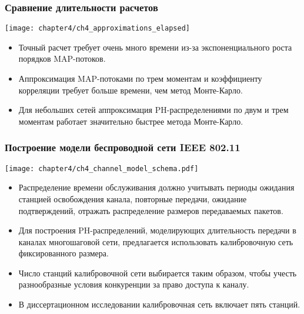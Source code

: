 \begin{frame}
    \frametitle{Сравнение длительности расчетов}
    \begin{center}
        \texttt{[image: chapter4/ch4\_approximations\_elapsed]}
    \end{center}
    \footnotesize
    \begin{itemize}
        \item Точный расчет требует очень много времени из-за экспоненциального роста порядков MAP-потоков.
        \item Аппроксимация MAP-потоками по трем моментам и коэффициенту корреляции требует больше времени, чем метод Монте-Карло.
        \item Для небольших сетей аппроксимация PH-распределениями по двум и трем моментам работает значительно быстрее метода Монте-Карло.
    \end{itemize}
\end{frame}

\begin{frame}
    \frametitle{Построение модели беспроводной сети IEEE 802.11}
    \begin{center}
        \texttt{[image: chapter4/ch4\_channel\_model\_schema.pdf]}
    \end{center}
    \footnotesize
    \begin{itemize}
        \item Распределение времени обслуживания должно учитывать периоды ожидания станцией освобождения канала, повторные передачи, ожидание подтверждений, отражать распределение размеров передаваемых пакетов.
        \item Для построения PH-распределений, моделирующих длительность передачи в каналах многошаговой сети, предлагается использовать калибровочную сеть фиксированного размера.
        \item Число станций калибровочной сети выбирается таким образом, чтобы учесть разнообразные условия конкуренции за право доступа к каналу.
        \item В диссертационном исследовании калибровочная сеть включает пять станций.
    \end{itemize}
\end{frame}


